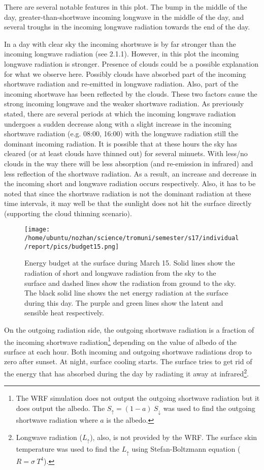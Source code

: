 \documentclass[a4paper,12pt]{article}
\numberwithin{equation}{section} %
\begin{document}
There are several notable features in this plot. The bump in the middle of the day, greater-than-shortwave incoming longwave in the middle of the day, and several troughs in the incoming longwave radiation towards the end of the day.

In a day with clear sky the incoming shortwave is by far stronger than the incoming longwave radiation (see 2.1.1). However, in this plot the incoming longwave radiation is stronger. Presence of clouds could be a possible explanation for what we observe here. Possibly clouds have absorbed part of the incoming shortwave radiation and re-emitted in longwave radiation. Also, part of the incoming shortwave has been reflected by the clouds. These two factors cause the strong incoming longwave and the weaker shortwave radiation. As previously stated, there are several periods at which the incoming longwave radiation undergoes a sudden decrease along with a slight increase in the incoming shortwave radiation (e.g. 08:00, 16:00) with the longwave radiation still the dominant incoming radiation. It is possible that at these hours the sky has cleared (or at least clouds have thinned out) for several minuets. With less/no clouds in the way there will be less absorption (and re-emission in infrared) and less reflection of the shortwave radiation. As a result, an increase and decrease in the incoming short and longwave radiation occurs respectively. Also, it has to be noted that since the shortwave radiation is not the dominant radiation at these time intervals, it may well be that the sunlight does not hit the surface directly (supporting the cloud thinning scenario).

\begin{figure}[bhp]
\texttt{[image: /home/ubuntu/nozhan/science/tromuni/semester/s17/individual/report/pics/budget15.png]}
\caption{Energy budget at the surface during March 15. Solid lines show the radiation of short and longwave radiation from the sky to the surface and dashed lines show the radiation from ground to the sky. The black solid line shows the net energy radiation at the surface during this day. The purple and green lines show the latent and sensible heat respectively.}
\label{budget15}
\end{figure}

On the outgoing radiation side, the outgoing shortwave radiation is a fraction of the incoming shortwave radiation\footnote{The WRF simulation does not output the outgoing shortwave radiation but it does output the albedo. The $S_{\uparrow} = (1 - a)\: S_{\downarrow}$ was used to find the outgoing shortwave radiation where $a$ is the albedo.} depending on the value of albedo of the surface at each hour. Both incoming and outgoing shortwave radiations drop to zero after sunset. At night, surface cooling starts. The surface tries to get rid of the energy that has absorbed during the day by radiating it away at infrared\footnote{Longwave radiation ($L_{\uparrow}$), also, is not provided by the WRF. The surface skin temperature was used to find the $L_{\uparrow}$ using Stefan-Boltzmann equation ($R = \sigma \: T^4$).}. 
\end{document}
